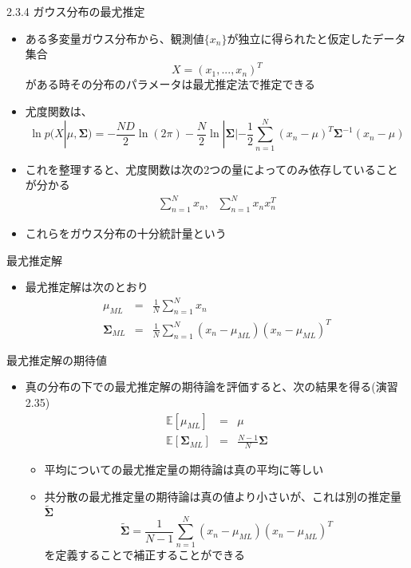 \begin{frame}{2.3.4 ガウス分布の最尤推定}
 \begin{itemize}
  \item  ある多変量ガウス分布から、観測値$\{x_n\}$が独立に得られたと仮定したデータ集合
         \begin{equation}
          X=(x_1,...,x_n)^T
         \end{equation}
         がある時その分布のパラメータは最尤推定法で推定できる
  \item 尤度関数は、
        \begin{equation}
         \ln  p(X|\mu, \bm{\Sigma}) = -\frac{ND}{2}\ln (2\pi)-\frac{N}{2}\ln |\bm{\Sigma}|-\frac{1}{2}\sum_{n=1}^{N}(x_n-\mu)^T\bm{\Sigma}^{-1}(x_n-\mu)
        \end{equation}
  \item これを整理すると、尤度関数は次の2つの量によってのみ依存していることが分かる
        \begin{eqnarray}
         \sum_{n=1}^{N}x_n, \ \ \  \sum_{n=1}^{N}x_nx_n^T
        \end{eqnarray}
  \item これらをガウス分布の\alert{十分統計量}という
 \end{itemize}
\end{frame}

\begin{frame}{最尤推定解}
 \begin{itemize}
  \item 最尤推定解は次のとおり
        \begin{eqnarray}
         \mu_{ML} &=& \frac{1}{N}\sum_{n=1}^{N}x_n\\
         \bm{\Sigma}_{ML}&=&\frac{1}{N}\sum_{n=1}^{N}(x_n-\mu_{ML})(x_n-\mu_{ML})^T
        \end{eqnarray}
 \end{itemize}
\end{frame}

\begin{frame}{最尤推定解の期待値}
 \begin{itemize}
  \item 真の分布の下での最尤推定解の期待論を評価すると、次の結果を得る(演習2.35)
        \begin{eqnarray}
         \mathbb{E}[\mu_{ML}]&=&\mu\\
         \mathbb{E}[\bm{\Sigma}_{ML}]&=&\frac{N-1}{N}\bm{\Sigma}
        \end{eqnarray}
        \begin{itemize}
         \item 平均についての最尤推定量の期待論は真の平均に等しい
         \item 共分散の最尤推定量の期待論は真の値より小さいが、これは別の推定量$\widetilde{\bm{\Sigma}}$
               \begin{equation}
                \widetilde{\bm{\Sigma}} = \frac{1}{N-1}\sum_{n=1}^{N}(x_n-\mu_{ML})(x_n-\mu_{ML})^T
               \end{equation}
               を定義することで補正することができる
        \end{itemize}
 \end{itemize}
\end{frame}
